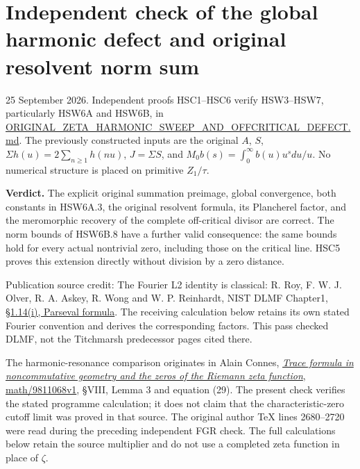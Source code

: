 \section{Independent check of the global harmonic defect and original
resolvent norm
sum}\label{independent-check-of-the-global-harmonic-defect-and-original-resolvent-norm-sum}

25 September 2026. Independent proofs HSC1--HSC6 verify HSW3--HSW7,
particularly HSW6A and HSW6B, in
\href{https://github.com/KokunoYumeto/zeta-function-research-reader/blob/main/workbenches/splitzero-tandem/continuations/20260925-full-source-tensor-and-original-divisor/counterfactual/ORIGINAL_ZETA_HARMONIC_SWEEP_AND_OFFCRITICAL_DEFECT.md}{ORIGINAL\_ZETA\_HARMONIC\_SWEEP\_AND\_OFFCRITICAL\_DEFECT.md}.
The previously constructed inputs are the original \(A\), \(S\),
\(\Sigma h(u)=2\sum_{n\ge1}h(nu)\), \(J=\Sigma S\), and
\(M_0b(s)=\int_0^\infty b(u)u^sdu/u\). No numerical structure is placed
on primitive \(Z_1/\tau\).

\textbf{Verdict.} The explicit original summation preimage, global
convergence, both constants in HSW6A.3, the original resolvent formula,
its Plancherel factor, and the meromorphic recovery of the complete
off-critical divisor are correct. The norm bounds of HSW6B.8 have a
further valid consequence: the same bounds hold for every actual
nontrivial zero, including those on the critical line. HSC5 proves this
extension directly without division by a zero distance.

Publication source credit: The Fourier L2 identity is classical: R. Roy,
F. W. J. Olver, R. A. Askey, R. Wong and W. P. Reinhardt, NIST DLMF
Chapter1, \href{https://dlmf.nist.gov/1.14\#i}{§1.14(i), Parseval
formula}. The receiving calculation below retains its own stated Fourier
convention and derives the corresponding factors. This pass checked
DLMF, not the Titchmarsh predecessor pages cited there.

The harmonic-resonance comparison originates in Alain Connes,
\href{https://arxiv.org/abs/math/9811068v1}{\emph{Trace formula in
noncommutative geometry and the zeros of the Riemann zeta function},
math/9811068v1}, §VIII, Lemma 3 and equation (29). The present check
verifies the stated programme calculation; it does not claim that the
characteristic-zero cutoff limit was proved in that source. The original
author TeX lines 2680--2720 were read during the preceding independent
FGR check. The full calculations below retain the source multiplier and
do not use a completed zeta function in place of \(\zeta\).

